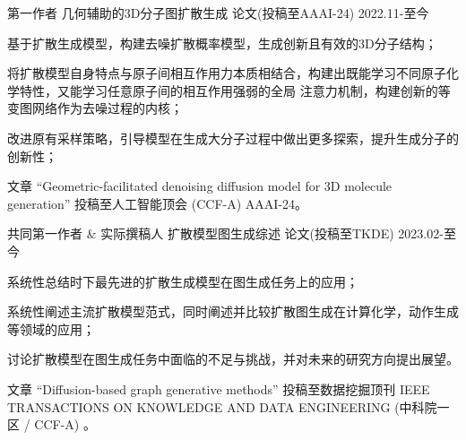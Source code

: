 \begin{cventries}
  
\cventry
{第一作者} %
{几何辅助的3D分子图扩散生成} %
{论文(投稿至AAAI-24)} %
{2022.11-至今} %
{
  \begin{cvitems} 
    \item {基于扩散生成模型，构建去噪扩散概率模型，生成创新且有效的3D分子结构；}
    \item {将扩散模型自身特点与原子间相互作用力本质相结合，构建出既能学习不同原子化学特性，又能学习任意原子间的相互作用强弱的全局
    注意力机制，构建创新的等变图网络作为去噪过程的内核；}
    \item {改进原有采样策略，引导模型在生成大分子过程中做出更多探索，提升生成分子的创新性；}
    \item {文章 “Geometric-facilitated denoising diffusion model for 3D molecule generation” 投稿至人工智能顶会 (CCF-A) AAAI-24。}
  \end{cvitems}
}

\cventry
{共同第一作者 \& 实际撰稿人} %
{扩散模型图生成综述} %
{论文(投稿至TKDE)} %
{2023.02-至今} %
{
  \begin{cvitems} 
    \item {系统性总结时下最先进的扩散生成模型在图生成任务上的应用；}
    \item {系统性阐述主流扩散模型范式，同时阐述并比较扩散图生成在计算化学，动作生成等领域的应用；}
    \item {讨论扩散模型在图生成任务中面临的不足与挑战，并对未来的研究方向提出展望。}
    \item {文章 “Diffusion-based graph generative methods” 投稿至数据挖掘顶刊 IEEE TRANSACTIONS ON KNOWLEDGE AND DATA ENGINEERING (中科院一区 / CCF-A) 。}
\end{cvitems}
}



\end{cventries}
